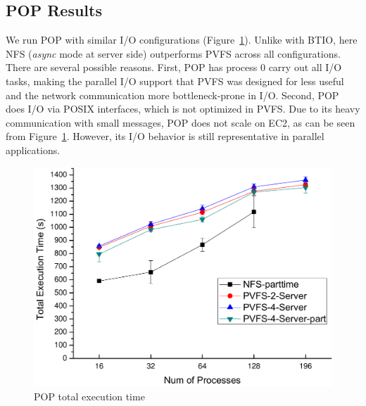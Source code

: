     \subsection{POP Results}
    We run POP with similar I/O configurations (Figure~\ref{fig:pop}). 
    Unlike with BTIO, here NFS (\textit{async} mode at server side)
    outperforms PVFS across all configurations. There are several possible
    reasons. First, POP has process 0 carry out all I/O tasks, making the
    parallel I/O support that PVFS was designed for less useful and the
    network communication more bottleneck-prone in I/O.  Second, POP does I/O
    via POSIX interfaces, which is not optimized in PVFS. Due to its heavy
    communication with small messages, POP does not scale on EC2, as can be
    seen from Figure~\ref{fig:pop}. However, its I/O behavior is still
    representative in parallel applications.
    \begin{figure}[htpb]
        \centering
        \includegraphics[width=0.8\linewidth]{../figures/pop}
        \caption{POP total execution time}
        \label{fig:pop}
    \end{figure}
